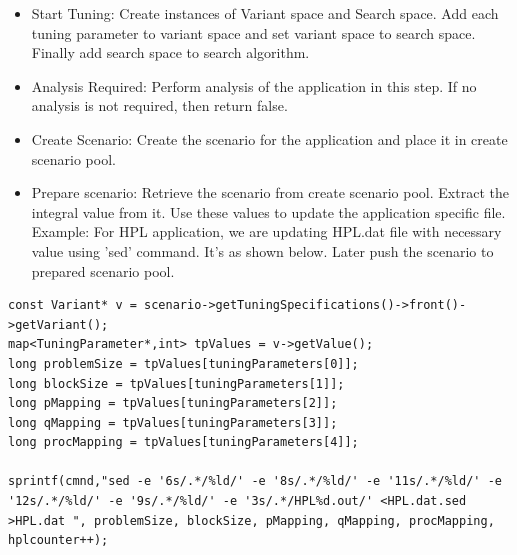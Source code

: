 \documentclass[10pt,twocolumn]{article}
\begin{document}
\begin{itemize}

\item Start Tuning: Create instances of Variant space and Search space. Add each tuning parameter to variant space and set variant space to search space. Finally add search space to search algorithm.

\item Analysis Required: Perform analysis of the application in this step. If no analysis is not required, then return false. 

\item Create Scenario: Create the scenario for the application and place it in create scenario pool.

\item Prepare scenario: Retrieve the scenario from create scenario pool. Extract the integral value from it. Use these values to update the application specific file. Example: For HPL application, we are updating HPL.dat file with necessary value using 'sed' command. It's as shown below. Later push the scenario to prepared scenario pool.
\end{itemize}
\begin{lstlisting}
const Variant* v = scenario->getTuningSpecifications()->front()->getVariant();
map<TuningParameter*,int> tpValues = v->getValue();
long problemSize = tpValues[tuningParameters[0]];
long blockSize = tpValues[tuningParameters[1]];
long pMapping = tpValues[tuningParameters[2]];
long qMapping = tpValues[tuningParameters[3]];
long procMapping = tpValues[tuningParameters[4]];

sprintf(cmnd,"sed -e '6s/.*/%ld/' -e '8s/.*/%ld/' -e '11s/.*/%ld/' -e '12s/.*/%ld/' -e '9s/.*/%ld/' -e '3s/.*/HPL%d.out/' <HPL.dat.sed >HPL.dat ", problemSize, blockSize, pMapping, qMapping, procMapping, hplcounter++);
\end{lstlisting}
\end{document}
